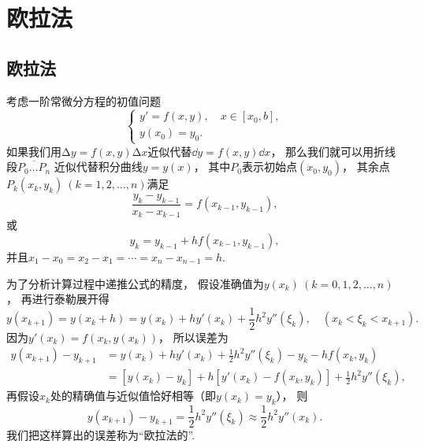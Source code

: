\section{欧拉法}
\subsection{欧拉法}
考虑一阶常微分方程的初值问题\begin{equation}\label{equation:一阶常微分方程的初值问题.微分形式}
	\begin{cases}
		y' = f(x,y), \quad x \in [x_0,b], \\
		y(x_0) = y_0.
	\end{cases}
\end{equation}
如果我们用\(\increment y = f(x,y) \increment x\)近似代替\(\dd{y} = f(x,y) \dd{x}\)，
那么我们就可以用折线段\(\overline{P_0 \dotso P_n}\)
近似代替积分曲线\(y = y(x)\)，
其中\(P_0\)表示初始点\((x_0,y_0)\)，
其余点\(P_k(x_k,y_k)\ (k=1,2,\dotsc,n)\)满足\begin{equation*}
	\frac{y_k - y_{k-1}}{x_k - x_{k-1}}
	= f(x_{k-1},y_{k-1}),
\end{equation*}
或\begin{equation}
	y_k = y_{k-1} + h f(x_{k-1},y_{k-1}),
\end{equation}
并且\(x_1 - x_0 = x_2 - x_1 = \dotsb = x_n - x_{n-1} = h\).

为了分析计算过程中递推公式的精度，
假设准确值为\(y(x_k)\ (k=0,1,2,\dotsc,n)\)，
再进行泰勒展开得\begin{equation*}
	y(x_{k+1})
	= y(x_k + h)
	= y(x_k)
	+ h y'(x_k)
	+ \frac12 h^2 y''(\xi_k),
	\quad(x_k < \xi_k < x_{k+1}).
\end{equation*}
因为\(
	y'(x_k)
	= f(x_k,y(x_k))
\)，
所以误差为\begin{align*}
	y(x_{k+1}) - y_{k+1}
	&=
		y(x_k)
		+ h y'(x_k)
		+ \frac12 h^2 y''(\xi_k)
		- y_k
		- h f(x_k,y_k) \\
	&=
		[
			y(x_k)
			- y_k
		]
		+ h [
			y'(x_k)
			- f(x_k,y_k)
		]
		+ \frac12 h^2 y''(\xi_k),
\end{align*}
再假设\(x_k\)处的精确值与近似值恰好相等（即\(y(x_k) = y_k\)），
则\begin{equation}
	y(x_{k+1}) - y_{k+1}
	= \frac12 h^2 y''(\xi_k)
	\approx \frac12 h^2 y''(x_k).
\end{equation}
我们把这样算出的误差称为“欧拉法的”.

